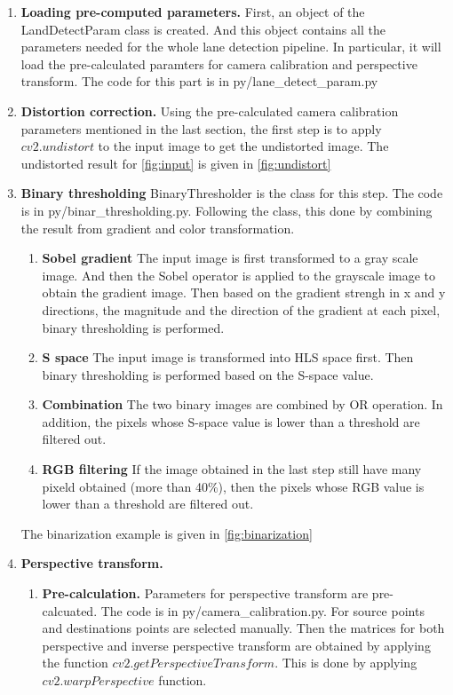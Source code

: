 \documentclass[12pt]{article}
\begin{document}
\begin{enumerate}
	\item \textbf{Loading pre-computed parameters.} First, an object of the LandDetectParam class is created. And this object contains all the parameters needed for the whole lane detection pipeline. In particular, it will load the pre-calculated paramters for camera calibration and perspective transform. The code for this part is in py/lane\_detect\_param.py
	 
	\item \textbf{Distortion correction.} Using the pre-calculated camera calibration parameters mentioned in the last section, the first step is to apply $cv2.undistort$ to the input image to get the undistorted image. The undistorted result for \ref{fig:input} is given in \ref{fig:undistort}

	\item  \textbf{Binary thresholding}  BinaryThresholder is the class for this step. The code is in py/binar\_thresholding.py. Following the class, this done by combining the result from gradient and color transformation.
		\begin{enumerate}
			\item \textbf{Sobel gradient} The input image is first transformed to a gray scale image. And then the Sobel operator is applied to the grayscale image to obtain the gradient image. Then based on the gradient strengh in x and y directions, the magnitude and the direction of the gradient at each pixel, binary thresholding is performed.

			\item  \textbf{S space} The input image is transformed into HLS space first. Then binary thresholding is performed based on the S-space value.
			\item \textbf{Combination} The two binary images are combined by OR operation. In addition, the pixels whose S-space value is lower than a threshold are filtered out.
			
			\item \textbf{RGB filtering} If the image obtained in the last step still have many pixeld obtained (more than 40\%), then the pixels whose RGB value is lower than a threshold are filtered out.
		\end{enumerate}
	The binarization example is given in \ref{fig:binarization}
	
	\item \textbf{Perspective transform.} 
		\begin{enumerate}
			\item \textbf{Pre-calculation.} Parameters for perspective transform are pre-calcuated. The code is in py/camera\_calibration.py. For source points and destinations points are selected manually. Then the matrices for both perspective and inverse perspective transform are obtained by applying the function $cv2.getPerspectiveTransform$. This is done by applying $cv2.warpPerspective$ function.
			

\end{enumerate}
\end{enumerate}
\end{document}
